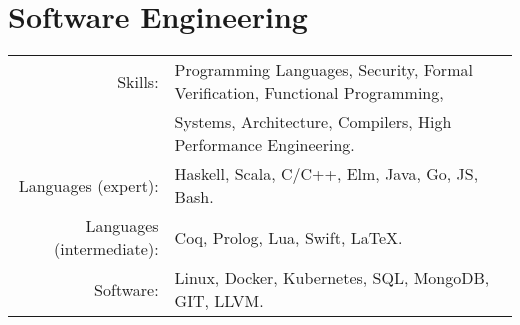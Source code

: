 \documentclass[lettersize,11pt]{article}
\begin{document}
\section{Software Engineering}
\begin{tabular}{rl}
Skills:& Programming Languages, Security, Formal Verification, Functional Programming, \\
	   & Systems, Architecture, Compilers, High Performance Engineering. \\
Languages (expert):& Haskell, Scala, C/C++, Elm, Java, Go, JS, Bash. \\
Languages (intermediate):& Coq, Prolog, Lua, Swift, \LaTeX. \\
Software:& Linux, Docker, Kubernetes, SQL, MongoDB, GIT, LLVM. \\
\end{tabular}


\end{document}
